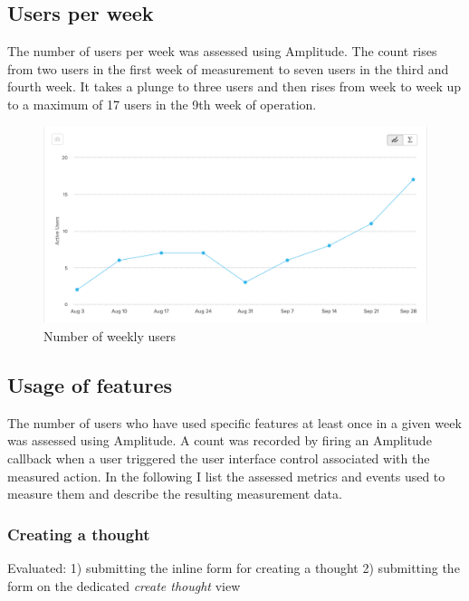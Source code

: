 \subsection{Users per week}\label{users-per-week}

The number of users per week was assessed using Amplitude. The count
rises from two users in the first week of measurement to seven users in
the third and fourth week. It takes a plunge to three users and then
rises from week to week up to a maximum of 17 users in the 9th week of
operation.

\begin{figure}[htbp]
\centering
\includegraphics{img/eval_weekly_users.png}
\caption{Number of weekly users}
\end{figure}

\subsection{Usage of features}\label{usage-of-features}

The number of users who have used specific features at least once in a
given week was assessed using Amplitude. A count was recorded by firing
an Amplitude callback when a user triggered the user interface control
associated with the measured action. In the following I list the
assessed metrics and events used to measure them and describe the
resulting measurement data.

\subsubsection{Creating a thought}\label{creating-a-thought}

Evaluated: 1) submitting the inline form for creating a thought 2)
submitting the form on the dedicated \emph{create thought} view

